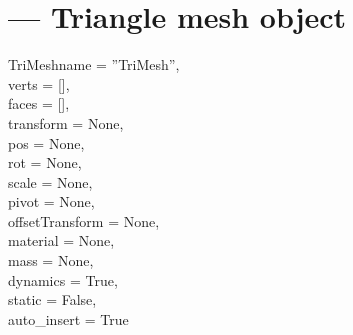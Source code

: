 
\section{ ---
         Triangle mesh object}

\begin{classdesc}{TriMesh}{name = ''TriMesh'',\\ 
                       verts = [],\\
                       faces = [],\\
                       transform = None,\\
                       pos = None,\\
                       rot = None,\\
                       scale = None,\\
                       pivot = None,\\
                       offsetTransform = None,\\
                       material = None,\\
                       mass = None,\\
                       dynamics = True,\\
                       static = False,\\
                       auto_insert = True}

\end{classdesc}


